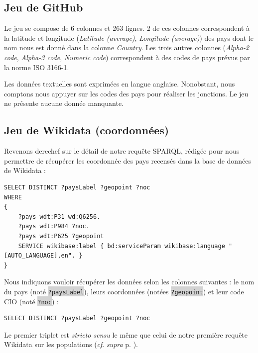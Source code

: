 \documentclass[hidelinks, 12pt]{report}
\newcommand{\code}[1]{\colorbox{LightGray}{\texttt{#1}}}
\begin{document}
%





\subsection{Jeu de GitHub}

Le jeu se compose de 6 colonnes et 263 lignes. 2 de ces colonnes correspondent à la latitude et longitude (\textit{Latitude (average)}, \textit{Longitude (average)}) des pays dont le nom nous est donné dans la colonne \textit{Country}. Les trois autres colonnes (\textit{Alpha-2 code}, \textit{Alpha-3 code}, \textit{Numeric code}) correspondent à des codes de pays prévus par la norme ISO 3166-1.

Les données textuelles sont exprimées en langue anglaise. Nonobstant, nous comptons nous appuyer sur les codes des pays pour réaliser les jonctions. Le jeu ne présente aucune donnée manquante.





%





\subsection{Jeu de Wikidata (coordonnées)}

Revenons derechef sur le détail de notre requête SPARQL, rédigée pour nous permettre de récupérer les coordonnée des pays recensés dans la base de données de Wikidata :

\begin{lstlisting}[language=SPARQL]
SELECT DISTINCT ?paysLabel ?geopoint ?noc
WHERE 
{
	?pays wdt:P31 wd:Q6256.
	?pays wdt:P984 ?noc.
	?pays wdt:P625 ?geopoint
	SERVICE wikibase:label { bd:serviceParam wikibase:language "[AUTO_LANGUAGE],en". }
}
\end{lstlisting}

Nous indiquons vouloir récupérer les données selon les colonnes suivantes : le nom du pays (noté \code{?paysLabel}), leurs coordonnées (notées \code{?geopoint}) et leur code CIO (noté \code{?noc}) :

\begin{lstlisting}[language=SPARQL]
	SELECT DISTINCT ?paysLabel ?geopoint ?noc
\end{lstlisting}

Le premier triplet est \textit{stricto sensu} le même que celui de notre première requête Wikidata sur les populations (\textit{cf}. \textit{supra} p. \pageref{query1}).
\end{document}
